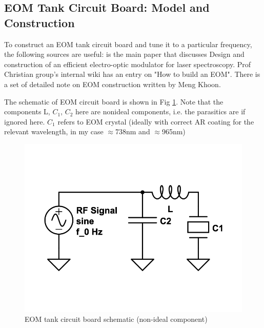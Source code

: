 \documentclass[12pt]{report}
\begin{document}
\subsection{EOM Tank Circuit Board: Model and Construction}
To construct an EOM tank circuit board and tune it to a particular frequency, the following sources are useful: \cite{20MHzEOM} is the main paper that discusses Design and construction of an efficient electro-optic modulator for laser spectroscopy. Prof Christian group's internal wiki has an entry on "How to build an EOM". There is a set of detailed note on EOM construction written by Meng Khoon. 
\par
The schematic of EOM circuit board is shown in Fig \ref{fig:eom-tank-cirucuit1}. Note that the components L, $C_1$, $C_2$ here are nonideal components, i.e. the parasitics are if ignored here.
$C_1$ refers to EOM crystal (ideally with correct AR coating for the relevant wavelength, in my case $\approx$738nm and $\approx$965nm)

\begin{figure}[H]
    \centering
    \includegraphics[width=.5\textwidth]{eom-tank-cirucuit1.png}
    \caption{EOM tank circuit board schematic (non-ideal component)}
    \label{fig:eom-tank-cirucuit1}
\end{figure}
\end{document}
